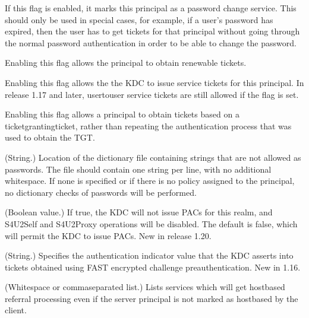 \documentclass[letterpaper,10pt,english]{sphinxmanual}
\begin{document}
\begin{description}
\begin{description}
\sphinxAtStartPar
If this flag is enabled, it marks this principal as a password
change service.  This should only be used in special cases,
for example, if a user’s password has expired, then the user
has to get tickets for that principal without going through
the normal password authentication in order to be able to
change the password.

\sphinxAtStartPar
Enabling this flag allows the principal to obtain renewable
tickets.

\sphinxAtStartPar
Enabling this flag allows the the KDC to issue service tickets
for this principal.  In release 1.17 and later, user\sphinxhyphen{}to\sphinxhyphen{}user
service tickets are still allowed if the  flag is
set.

\sphinxAtStartPar
Enabling this flag allows a principal to obtain tickets based
on a ticket\sphinxhyphen{}granting\sphinxhyphen{}ticket, rather than repeating the
authentication process that was used to obtain the TGT.

\end{description}

\sphinxAtStartPar
(String.)  Location of the dictionary file containing strings that
are not allowed as passwords.  The file should contain one string
per line, with no additional whitespace.  If none is specified or
if there is no policy assigned to the principal, no dictionary
checks of passwords will be performed.

\sphinxAtStartPar
(Boolean value.)  If true, the KDC will not issue PACs for this
realm, and S4U2Self and S4U2Proxy operations will be disabled.
The default is false, which will permit the KDC to issue PACs.
New in release 1.20.

\sphinxAtStartPar
(String.)  Specifies the authentication indicator value that the KDC
asserts into tickets obtained using FAST encrypted challenge
pre\sphinxhyphen{}authentication.  New in 1.16.

\sphinxAtStartPar
(Whitespace\sphinxhyphen{} or comma\sphinxhyphen{}separated list.)  Lists services which will
get host\sphinxhyphen{}based referral processing even if the server principal is
not marked as host\sphinxhyphen{}based by the client.


\end{description}
\end{document}
